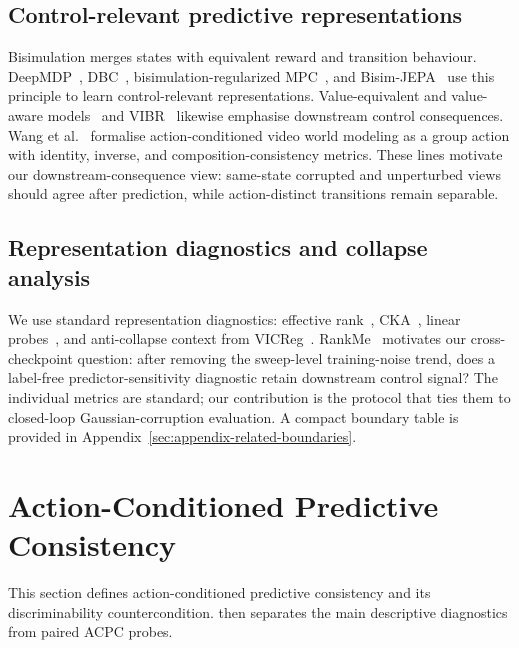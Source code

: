 \documentclass[10pt]{article}
\begin{document}
\subsection{Control-relevant predictive representations}
Bisimulation merges states with equivalent reward and transition behaviour. DeepMDP~\cite{gelada2019deepmdp}, DBC~\cite{zhang2021dbc}, bisimulation-regularized MPC~\cite{bsmpc}, and Bisim-JEPA~\cite{toso2026bisimjepa} use this principle to learn control-relevant representations. Value-equivalent and value-aware models~\cite{grimm2020valueequivalence,voelcker2025calibratedvalueaware} and VIBR~\cite{dupuis2023vibr} likewise emphasise downstream control consequences. Wang et al.~\cite{wang2026groupactions} formalise action-conditioned video world modeling as a group action with identity, inverse, and composition-consistency metrics. These lines motivate our downstream-consequence view: same-state corrupted and unperturbed views should agree after prediction, while action-distinct transitions remain separable.

\subsection{Representation diagnostics and collapse analysis}
We use standard representation diagnostics: effective rank~\cite{roy2007effrank,jing2022dimcollapse,teoh2025nextlatent}, CKA~\cite{kornblith2019cka}, linear probes~\cite{alain2017linearprobes}, and anti-collapse context from VICReg~\cite{bardes2022vicreg}. RankMe~\cite{garrido2023rankme} motivates our cross-checkpoint question: after removing the sweep-level training-noise trend, does a label-free predictor-sensitivity diagnostic retain downstream control signal? The individual metrics are standard; our contribution is the protocol that ties them to closed-loop Gaussian-corruption evaluation. A compact boundary table is provided in Appendix~\ref{sec:appendix-related-boundaries}.

\section{Action-Conditioned Predictive Consistency}\label{sec:acpc}

This section defines action-conditioned predictive consistency and its discriminability countercondition.  then separates the main descriptive diagnostics from paired ACPC probes.
\end{document}
